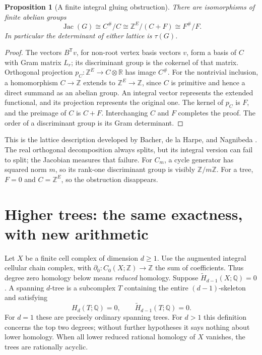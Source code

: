\documentclass[11pt]{article}
\newtheorem{proposition}[theorem]{Proposition}
\theoremstyle{definition}
\theoremstyle{remark}
\newcommand{\Q}{\mathbb Q}
\newcommand{\Z}{\mathbb Z}
\newcommand{\R}{\mathbb R}
\begin{document}
\begin{proposition}[A finite integral gluing obstruction]
There are isomorphisms of finite abelian groups
\[
 \operatorname{Jac}(G)\cong C^\#/C
 \cong\Z^E/(C+F)\cong F^\#/F.
\]
In particular the determinant of either lattice is \(\tau(G)\).
\end{proposition}
\begin{proof}
The vectors \(B^{\mathsf T}v\), for non-root vertex basis vectors \(v\),
form a basis of \(C\) with Gram matrix \(L_r\); its discriminant group
is the cokernel of that matrix.  Orthogonal projection
\(p_C:\Z^E\to C\otimes\R\) has image \(C^\#\).  For the nontrivial
inclusion, a homomorphism \(C\to\Z\) extends to \(\Z^E\to\Z\), since
\(C\) is primitive and hence a direct summand as an abelian group.
An integral vector represents the extended functional, and its projection
represents the original one.  The kernel of \(p_C\) is \(F\), and the
preimage of \(C\) is \(C+F\).  Interchanging \(C\) and \(F\) completes
the proof.  The order of a discriminant group is its Gram determinant.
\end{proof}

This is the lattice description developed by Bacher, de la Harpe, and
Nagnibeda \cite{gih-bacher-lattices}.  The real orthogonal decomposition
always splits, but its integral version can fail to split; the Jacobian
measures that failure.  For \(C_m\), a cycle generator has squared norm
\(m\), so its rank-one discriminant group is visibly \(\Z/m\Z\).
For a tree, \(F=0\) and \(C=\Z^E\), so the obstruction disappears.

\section{Higher trees: the same exactness, with new arithmetic}
\label{sec:gih-higher}

Let \(X\) be a finite cell complex of dimension \(d\ge1\).  Use the
augmented integral cellular chain complex, with
\(\partial_0:C_0(X;\Z)\to\Z\) the sum of coefficients.  Thus degree
zero homology below means \emph{reduced} homology.  Suppose
\(\widetilde H_{d-1}(X;\Q)=0\).  A spanning \(d\)-tree is a subcomplex
\(T\) containing the entire \((d-1)\)-skeleton and satisfying
\[
 H_d(T;\Q)=0,\qquad\widetilde H_{d-1}(T;\Q)=0.
\]
For \(d=1\) these are precisely ordinary spanning trees.  For \(d>1\)
this definition concerns the top two degrees; without further hypotheses
it says nothing about lower homology.  When all lower reduced rational
homology of \(X\) vanishes, the trees are rationally acyclic.
\end{document}
